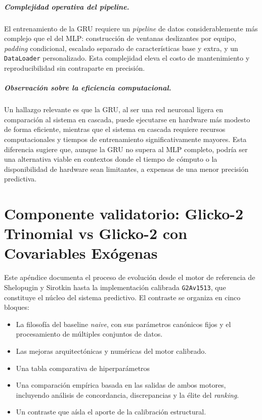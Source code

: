 \paragraph{Complejidad operativa del pipeline.} El entrenamiento de la GRU requiere un \textit{pipeline} de datos considerablemente m\'as complejo que el del MLP: construcci\'on de ventanas deslizantes por equipo, \textit{padding} condicional, escalado separado de caracter\'isticas base y extra, y un \texttt{DataLoader} personalizado. Esta complejidad eleva el costo de mantenimiento y reproducibilidad sin contraparte en precisi\'on.

\paragraph{Observaci\'on sobre la eficiencia computacional.} Un hallazgo relevante es que la GRU, al ser una red neuronal ligera en comparaci\'on al sistema en cascada, puede ejecutarse en hardware m\'as modesto de forma eficiente, mientras que el sistema en cascada requiere recursos computacionales y tiempos de entrenamiento significativamente mayores. Esta diferencia sugiere que, aunque la GRU no supera al MLP completo, podr\'ia ser una alternativa viable en contextos donde el tiempo de c\'omputo o la disponibilidad de hardware sean limitantes, a expensas de una menor precisi\'on predictiva.


\chapter{Componente validatorio: Glicko-2 Trinomial vs Glicko-2 con Covariables Ex\'ogenas}
\label{app:glicko_comparativo}

Este ap\'endice documenta el proceso de evoluci\'on desde el motor de referencia de Shelopugin y Sirotkin \cite{Glicko2Mod} hasta la implementaci\'on calibrada \texttt{G2Av1513}, que constituye el n\'ucleo del sistema predictivo. El contraste se organiza en cinco bloques: 

\begin{itemize}
	\item La filosof\'ia del baseline \textit{naive}, con sus par\'ametros can\'onicos fijos y el procesamiento de m\'ultiples conjuntos de datos.
	\item Las mejoras arquitect\'onicas y num\'ericas del motor calibrado.
	\item Una tabla comparativa de hiperpar\'ametros
	\item Una comparaci\'on emp\'irica basada en las salidas de ambos motores, incluyendo an\'alisis de concordancia, discrepancias y la \'elite del \textit{ranking}.
	\item Un contraste que a\'isla el aporte de la calibraci\'on estructural.
\end{itemize}


